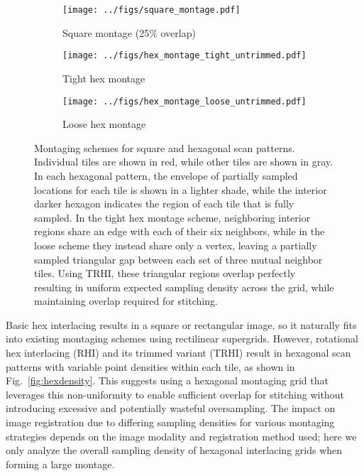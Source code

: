 \documentclass{article}
\newcommand{\reffig}[1]{Fig.~\ref{fig:#1}}
\begin{document}
\begin{figure}[ht]
\centering
    \begin{subfigure}[b]{0.3\textwidth}
        \centering
        \texttt{[image: ../figs/square\_montage.pdf]}
        \caption{Square montage (25\% overlap)}
        \label{fig:square montage}
    \end{subfigure}
    \hfill
    \begin{subfigure}[b]{0.3\textwidth}
        \centering
        \texttt{[image: ../figs/hex\_montage\_tight\_untrimmed.pdf]}
        \caption{Tight hex montage}
        \label{fig:tight hex montage}
    \end{subfigure}
    \hfill
    \begin{subfigure}[b]{0.3\textwidth}
        \centering
        \texttt{[image: ../figs/hex\_montage\_loose\_untrimmed.pdf]}
        \caption{Loose hex montage}
        \label{fig:loose hex montage}
    \end{subfigure}
    \caption{Montaging schemes for square and hexagonal scan patterns.
    Individual tiles are shown in red, while other tiles are shown in gray.
    In each hexagonal pattern, the envelope of partially sampled locations for
    each tile is shown in a lighter shade, while the interior darker hexagon
    indicates the region of each tile that is fully sampled.
    In the tight hex montage scheme, neighboring interior regions share an edge
    with each of their six neighbors, while in the loose scheme they instead
    share only a vertex, leaving a partially sampled triangular gap between each
    set of three mutual neighbor tiles.
    Using TRHI, these triangular regions overlap perfectly resulting in uniform
    expected sampling density across the grid, while maintaining overlap required for
    stitching.}
\label{fig:montage} 
\end{figure}

Basic hex interlacing results in a square or rectangular image, so it naturally
fits into existing montaging schemes using rectilinear supergrids.
%
However, rotational hex interlacing (RHI) and its trimmed variant (TRHI) result in
hexagonal scan patterns with variable point densities within each tile, as shown
in \reffig{hexdensity}.
%
This suggests using a hexagonal montaging grid that leverages this
non-uniformity to enable sufficient overlap for stitching without introducing
excessive and potentially wasteful oversampling.
%
The impact on image registration due to differing sampling densities for various
montaging strategies depends on the image modality and registration method used;
here we only analyze the overall sampling density of hexagonal interlacing grids
when forming a large montage.
\end{document}
